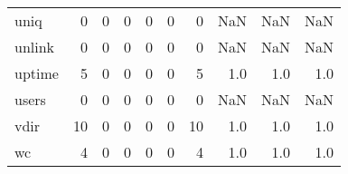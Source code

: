 \begin{longtable}{lrrrrrrrrr}
uniq      &                                                  0 &                                                  0 &                                                  0 &                                                  0 &                                                  0 &                                                  0 &                                                NaN &                                    NaN &                                  NaN \\
unlink    &                                                  0 &                                                  0 &                                                  0 &                                                  0 &                                                  0 &                                                  0 &                                                NaN &                                    NaN &                                  NaN \\
uptime    &                                                  5 &                                                  0 &                                                  0 &                                                  0 &                                                  0 &                                                  5 &                                                1.0 &                                    1.0 &                                  1.0 \\
users     &                                                  0 &                                                  0 &                                                  0 &                                                  0 &                                                  0 &                                                  0 &                                                NaN &                                    NaN &                                  NaN \\
vdir      &                                                 10 &                                                  0 &                                                  0 &                                                  0 &                                                  0 &                                                 10 &                                                1.0 &                                    1.0 &                                  1.0 \\
wc        &                                                  4 &                                                  0 &                                                  0 &                                                  0 &                                                  0 &                                                  4 &                                                1.0 &                                    1.0 &                                  1.0 \\

\end{longtable}
